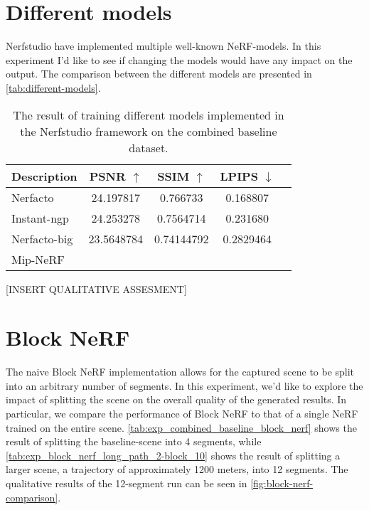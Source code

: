 \section{Different models}
Nerfstudio have implemented multiple well-known NeRF-models. In this experiment I'd like to see if changing the models would have any impact on the output. The comparison between the different models are presented in \autoref{tab:different-models}.


\begin{table}[ht]
\centering
\setlength{\tabcolsep}{6pt}
\renewcommand{\arraystretch}{1.5}
\begin{tabular}{l | C{2.2} C{1.3} C{1.3} c}
\hline
\textbf{Description} & \textbf{PSNR $\uparrow$} & \textbf{SSIM $\uparrow$} & \textbf{LPIPS $\downarrow$} \\
\hline
Nerfacto        & 24.197817                     & 0.766733     & 0.168807 \\
Instant-ngp     & 24.253278   & 0.7564714                     & 0.231680 \\
Nerfacto-big    & 23.5648784     & 0.74144792     & 0.2829464 \\
Mip-NeRF & & & \\
\hline
\end{tabular}
\caption{The result of training different models implemented in the Nerfstudio framework on the combined baseline dataset.}
\label{tab:different-models}
\end{table}

[INSERT QUALITATIVE ASSESMENT]














\section{Block NeRF}

The naive Block NeRF implementation allows for the captured scene to be split into an arbitrary number of segments. In this experiment, we'd like to explore the impact of splitting the scene on the overall quality of the generated results. In particular, we compare the performance of Block NeRF to that of a single NeRF trained on the entire scene. \autoref{tab:exp_combined_baseline_block_nerf} shows the result of splitting the baseline-scene into 4 segments, while \autoref{tab:exp_block_nerf_long_path_2-block_10} shows the result of splitting a larger scene, a trajectory of approximately 1200 meters, into 12 segments. The qualitative results of the 12-segment run can be seen in \autoref{fig:block-nerf-comparison}.

